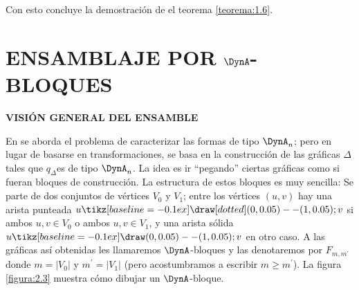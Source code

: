 Con esto concluye la demostración de el teorema \ref{teorema:1.6}.\\

\section{ENSAMBLAJE POR $\DynA$-BLOQUES}

\textbf{VISIÓN GENERAL DEL ENSAMBLE}

En \citep{Barot1999ACO} se aborda el problema de caracterizar las formas de tipo $\DynA_{n}$; pero en lugar de basarse en transformaciones, se basa en la construcción de las gráficas $\Delta$ tales que $q_{\Delta}$es de tipo  $\DynA_{n}$. La idea es ir ``pegando'' ciertas gráficas como si fueran bloques de construcción. La estructura de estos bloques es muy sencilla: Se parte de dos conjuntos de vértices $V_{0}$ y $V_{1}$; entre los vértices $\left(u, v\right)$ hay una arista punteada $u\tikz[baseline=-0.1ex]\draw [dotted] (0,0.05) -- (1,0.05); v$ si ambos $u, v \in V_{0}$ o ambos $u, v \in V_{1}$, y una arista sólida $u \tikz[baseline=-0.1ex]\draw (0,0.05) -- (1,0.05); v$ en otro caso. A las gráficas así obtenidas les llamaremos $\DynA$-bloques y las denotaremos por $F_{m,m^{'}}$ donde $m = |V_{0}|$ y $m^{'} = |V_{1}|$ (pero acostumbramos a escribir $m \geq m^{'}$). La figura \ref{figura:2.3} muestra cómo dibujar un $\DynA$-bloque.\\

